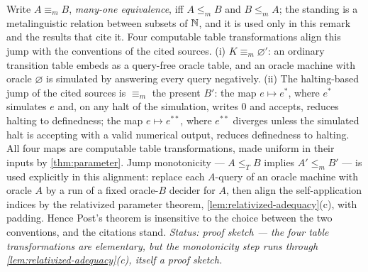 \begin{remark}
\label{rem:jump-convention}
Write \(A\equiv_m B\), \emph{many-one equivalence}, iff
\(A\leq_m B\) and \(B\leq_m A\); the standing is a metalinguistic relation
between subsets of \(\mathbb{N}\), and it is used only in this remark and the
results that cite it.  Four computable table transformations align this
jump with the conventions of the cited sources.  (i)
\(K\equiv_m\varnothing'\): an
ordinary transition table embeds as a query-free oracle table, and an
oracle machine with oracle \(\varnothing\) is simulated by answering
every query negatively.  (ii) The halting-based jump of the cited sources
is \(\equiv_m\) the present \(B'\): the map \(e\mapsto e^*\), where
\(e^*\) simulates \(e\) and, on any halt of the simulation, writes \(0\)
and accepts, reduces halting to definedness; the map
\(e\mapsto e^{**}\), where \(e^{**}\) diverges unless the simulated halt
is accepting with a valid numerical output, reduces definedness to
halting.  All four maps are computable table transformations, made
uniform in their inputs by \cref{thm:parameter}.  Jump monotonicity ---
\(A\leq_T B\) implies \(A'\leq_m B'\) --- is used explicitly in this
alignment: replace each \(A\)-query of an oracle machine with oracle
\(A\) by a run of a fixed oracle-\(B\) decider for \(A\), then align the
self-application indices by the relativized parameter theorem,
\cref{lem:relativized-adequacy}(c), with padding.  Hence Post's theorem
is insensitive to the choice between the two conventions, and the
citations stand.
\textit{Status: proof sketch --- the four table transformations are
elementary, but the monotonicity step runs through
\cref{lem:relativized-adequacy}(c), itself a proof sketch.}
\end{remark}

